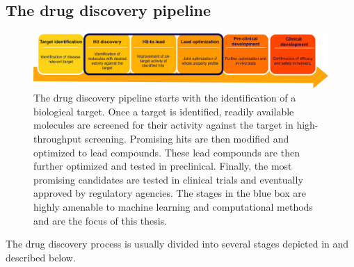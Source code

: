 \subsection{The drug discovery pipeline}
\begin{figure}
      \centering
      \includegraphics[width=\textwidth]{figures/drug-discovery-pipeline.pdf}
      \caption{The drug discovery pipeline starts with the identification of a biological target.
            Once a target is identified, readily available molecules are screened for their activity
            against the target in high-throughput screening. Promising hits are then modified and
            optimized to lead compounds. These lead compounds are then further optimized and tested
            in preclinical. Finally, the most promising candidates are tested in clinical trials and
            eventually approved by regulatory agencies. The stages in the blue box are highly
            amenable to machine learning and computational methods and are the focus of this
            thesis.\label{fig:drug-discovery-pipeline}}
\end{figure}

The drug discovery process is usually divided into several stages \citep{todo} depicted in
 and described below.

